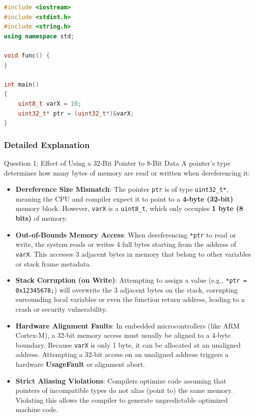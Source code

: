 \documentclass[11pt,a4paper]{article}
\begin{document}
\begin{lstlisting}[language=C++]
#include <iostream>
#include <stdint.h>
#include <string.h>
using namespace std;

void func() {
}

int main()
{
    uint8_t varX = 10;
    uint32_t* ptr = (uint32_t*)&varX;
}
\end{lstlisting}

\subsubsection{Detailed Explanation}

\begin{explanationbox}{Question 1: Effect of Using a 32-Bit Pointer to 8-Bit Data}
    A pointer's type determines how many bytes of memory are read or written when dereferencing it:
    \begin{itemize}
        \item \textbf{Dereference Size Mismatch}: The pointer \texttt{ptr} is of type \texttt{uint32\_t*}, meaning the CPU and compiler expect it to point to a \textbf{4-byte (32-bit)} memory block. However, \texttt{varX} is a \texttt{uint8\_t}, which only occupies \textbf{1 byte (8 bits)} of memory.
        \item \textbf{Out-of-Bounds Memory Access}: When dereferencing \texttt{*ptr} to read or write, the system reads or writes 4 full bytes starting from the address of \texttt{varX}. This accesses 3 adjacent bytes in memory that belong to other variables or stack frame metadata.
        \item \textbf{Stack Corruption (on Write)}: Attempting to assign a value (e.g., \texttt{*ptr = 0x12345678;}) will overwrite the 3 adjacent bytes on the stack, corrupting surrounding local variables or even the function return address, leading to a crash or security vulnerability.
        \item \textbf{Hardware Alignment Faults}: In embedded microcontrollers (like ARM Cortex-M), a 32-bit memory access must usually be aligned to a 4-byte boundary. Because \texttt{varX} is only 1 byte, it can be allocated at an unaligned address. Attempting a 32-bit access on an unaligned address triggers a hardware \textbf{UsageFault} or alignment abort.
        \item \textbf{Strict Aliasing Violations}: Compilers optimize code assuming that pointers of incompatible types do not alias (point to) the same memory. Violating this allows the compiler to generate unpredictable optimized machine code.
    \end{itemize}
\end{explanationbox}
\end{document}

